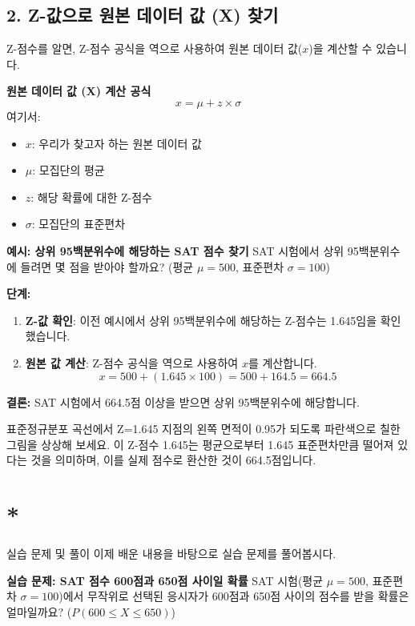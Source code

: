\documentclass[11pt,a4paper]{article}
\theoremstyle{definition}
\newcommand{\newsection}[1]{\newpage\section{#1}}
\begin{document}
\subsection{2. Z-값으로 원본 데이터 값 (X) 찾기}
Z-점수를 알면, Z-점수 공식을 역으로 사용하여 원본 데이터 값($x$)을 계산할 수 있습니다.

\begin{definitionbox}
\textbf{원본 데이터 값 (X) 계산 공식}
\[ x = \mu + z \times \sigma \]
여기서:
\begin{itemize}
    \item $x$: 우리가 찾고자 하는 원본 데이터 값
    \item $\mu$: 모집단의 평균
    \item $z$: 해당 확률에 대한 Z-점수
    \item $\sigma$: 모집단의 표준편차
\end{itemize}
\end{definitionbox}

\begin{examplebox}
\textbf{예시: 상위 95백분위수에 해당하는 SAT 점수 찾기}
SAT 시험에서 상위 95백분위수에 들려면 몇 점을 받아야 할까요? (평균 $\mu=500$, 표준편차 $\sigma=100$)

\textbf{단계:}
\begin{enumerate}
    \item \textbf{Z-값 확인}: 이전 예시에서 상위 95백분위수에 해당하는 Z-점수는 1.645임을 확인했습니다.
    \item \textbf{원본 값 계산}: Z-점수 공식을 역으로 사용하여 $x$를 계산합니다.
    \[ x = 500 + (1.645 \times 100) = 500 + 164.5 = 664.5 \]
\end{enumerate}
\textbf{결론:} SAT 시험에서 664.5점 이상을 받으면 상위 95백분위수에 해당합니다.

\begin{tcolorbox}[title=\textbf{시각적 이해}, colback=lightblue!50!white, colframe=darkblue]
표준정규분포 곡선에서 Z=1.645 지점의 왼쪽 면적이 0.95가 되도록 파란색으로 칠한 그림을 상상해 보세요. 이 Z-점수 1.645는 평균으로부터 1.645 표준편차만큼 떨어져 있다는 것을 의미하며, 이를 실제 점수로 환산한 것이 664.5점입니다.
\end{tcolorbox}
\end{examplebox}

\newsection*{실습 문제 및 풀이}
이제 배운 내용을 바탕으로 실습 문제를 풀어봅시다.

\begin{examplebox}
\textbf{실습 문제: SAT 점수 600점과 650점 사이일 확률}
SAT 시험(평균 $\mu=500$, 표준편차 $\sigma=100$)에서 무작위로 선택된 응시자가 600점과 650점 사이의 점수를 받을 확률은 얼마일까요? ($P(600 \le X \le 650)$)
\end{examplebox}
\end{document}

